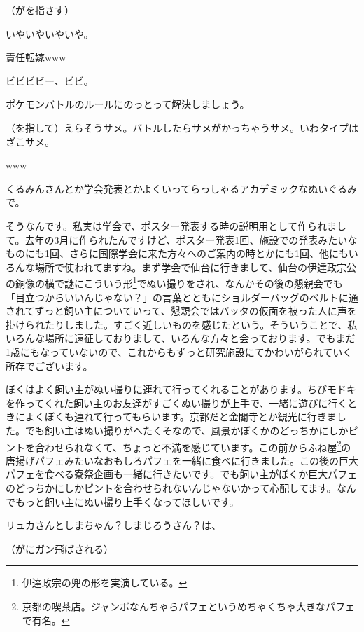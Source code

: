 \documentclass[9pt,4aj]{jsarticle}
\begin{document}
\begin{multicols}{2}
（がを指さす）

いやいやいやいや。

責任転嫁www

ビビビビー、ビビ。

ポケモンバトルのルールにのっとって解決しましょう。

（を指して）えらそうサメ。バトルしたらサメがかっちゃうサメ。いわタイプはざこサメ。

www

くるみんさんとか学会発表とかよくいってらっしゃるアカデミックなぬいぐるみで。

そうなんです。私実は学会で、ポスター発表する時の説明用として作られまして。去年の3月に作られたんですけど、ポスター発表1回、施設での発表みたいなものにも1回、さらに国際学会に来た方々へのご案内の時とかにも1回、他にもいろんな場所で使われてますね。まず学会で仙台に行きまして、仙台の伊達政宗公の銅像の横で謎にこういう形\footnote{伊達政宗の兜の形を実演している。}でぬい撮りをされ、なんかその後の懇親会でも「目立つからいいんじゃない？」の言葉とともにショルダーバッグのベルトに通されてずっと飼い主についていって、懇親会ではバッタの仮面を被った人に声を掛けられたりしました。すごく近しいものを感じたという。そういうことで、私いろんな場所に遠征しておりまして、いろんな方々と会っております。でもまだ1歳にもなっていないので、これからもずっと研究施設にてかわいがられていく所存でございます。

ぼくはよく飼い主がぬい撮りに連れて行ってくれることがあります。ちびモドキを作ってくれた飼い主のお友達がすごくぬい撮りが上手で、一緒に遊びに行くときによくぼくも連れて行ってもらいます。京都だと金閣寺とか観光に行きました。でも飼い主はぬい撮りがへたくそなので、風景かぼくかのどっちかにしかピントを合わせられなくて、ちょっと不満を感じています。この前からふね屋\footnote{京都の喫茶店。ジャンボなんちゃらパフェというめちゃくちゃ大きなパフェで有名。}の唐揚げパフェみたいなおもしろパフェを一緒に食べに行きました。この後の巨大パフェを食べる寮祭企画も一緒に行きたいです。でも飼い主がぼくか巨大パフェのどっちかにしかピントを合わせられないんじゃないかって心配してます。なんでもっと飼い主にぬい撮り上手くなってほしいです。

リュカさんとしまちゃん？しまじろうさん？は、

（がにガン飛ばされる）


\end{multicols}
\end{document}
